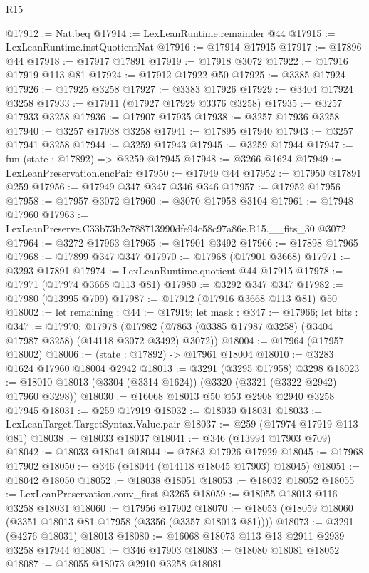 \begin{lexlean}{R15}
\begin{coremodule}
@17912 := Nat.beq
@17914 := LexLeanRuntime.remainder @44
@17915 := LexLeanRuntime.instQuotientNat
@17916 := @17914 @17915
@17917 := @17896 @44
@17918 := @17917 @17891
@17919 := @17918 @3072
@17922 := @17916 @17919 @113 @81
@17924 := @17912 @17922 @50
@17925 := @3385 @17924
@17926 := @17925 @3258
@17927 := @3383 @17926
@17929 := @3404 @17924 @3258
@17933 := @17911 (@17927 @17929 @3376 @3258)
@17935 := @3257 @17933 @3258
@17936 := @17907 @17935
@17938 := @3257 @17936 @3258
@17940 := @3257 @17938 @3258
@17941 := @17895 @17940
@17943 := @3257 @17941 @3258
@17944 := @3259 @17943
@17945 := @3259 @17944
@17947 := fun (state : @17892) => @3259 @17945
@17948 := @3266 @1624
@17949 := LexLeanPreservation.encPair
@17950 := @17949 @44
@17952 := @17950 @17891 @259
@17956 := @17949 @347 @347 @346 @346
@17957 := @17952 @17956
@17958 := @17957 @3072
@17960 := @3070 @17958 @3104
@17961 := @17948 @17960
@17963 := LexLeanPreserve.C33b73b2e788713990dfe94c58c97a86e.R15.__fits_30 @3072
@17964 := @3272 @17963
@17965 := @17901 @3492
@17966 := @17898 @17965
@17968 := @17899 @347 @347
@17970 := @17968 (@17901 @3668)
@17971 := @3293 @17891
@17974 := LexLeanRuntime.quotient @44 @17915
@17978 := @17971 (@17974 @3668 @113 @81)
@17980 := @3292 @347 @347
@17982 := @17980 (@13995 @709)
@17987 := @17912 (@17916 @3668 @113 @81) @50
@18002 := let remaining : @44 := @17919;
  let mask : @347 := @17966;
  let bits : @347 := @17970;
  @17978 (@17982 (@7863 (@3385 @17987 @3258) (@3404 @17987 @3258) (@14118 @3072 @3492) @3072))
@18004 := @17964 (@17957 @18002)
@18006 := (state : @17892) -> @17961 @18004
@18010 := @3283 @1624 @17960 @18004 @2942
@18013 := @3291 (@3295 @17958) @3298
@18023 := @18010 @18013 (@3304 (@3314 @1624)) (@3320 (@3321 (@3322 @2942) @17960 @3298))
@18030 := @16068 @18013 @50 @53 @2908 @2940 @3258 @17945
@18031 := @259 @17919
@18032 := @18030 @18031
@18033 := LexLeanTarget.TargetSyntax.Value.pair
@18037 := @259 (@17974 @17919 @113 @81)
@18038 := @18033 @18037
@18041 := @346 (@13994 @17903 @709)
@18042 := @18033 @18041
@18044 := @7863 @17926 @17929
@18045 := @17968 @17902
@18050 := @346 (@18044 (@14118 @18045 @17903) @18045)
@18051 := @18042 @18050
@18052 := @18038 @18051
@18053 := @18032 @18052
@18055 := LexLeanPreservation.conv_first @3265
@18059 := @18055 @18013 @116 @3258 @18031
@18060 := @17956 @17902
@18070 := @18053 (@18059 @18060 (@3351 @18013 @81 @17958 (@3356 (@3357 @18013 @81))))
@18073 := @3291 (@4276 @18031) @18013
@18080 := @16068 @18073 @113 @13 @2911 @2939 @3258 @17944
@18081 := @346 @17903
@18083 := @18080 @18081 @18052
@18087 := @18055 @18073 @2910 @3258 @18081

\end{coremodule}
\end{lexlean}
